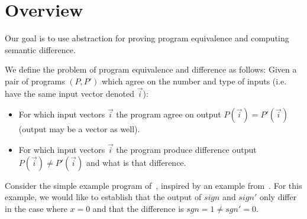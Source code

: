 \section{Overview}

Our goal is to use abstraction for proving program equivalence and computing semantic difference.

We define the problem of program equivalence and difference as follows: Given a pair of programs $(P,P')$ which agree on the number and type of inputs (i.e. have the same input vector denoted $\vec{i}$):
\begin{itemize}
\item For which input vectors $\vec{i}$ the program agree on output $P(\vec{i}) = P'(\vec{i})$ (output may be a vector as well).
\item For which input vectors $\vec{i}$ the program produce difference output $P(\vec{i}) \neq P'(\vec{i})$ and what is that difference.
\end{itemize}



Consider the simple example program of~, inspired by an example from~\cite{RM:TOPLAS07}. For this example, we would like to establish that the output of $sign$ and $sign'$ only differ in the case where $x=0$ and that the difference is $sgn = 1 \neq sgn' = 0$.

